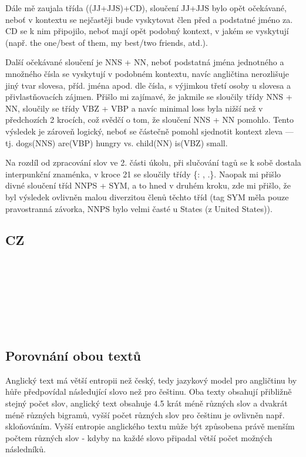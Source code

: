 \documentclass[12pt, a4paper]{report}
\theoremstyle{remark}
\begin{document}
Dále mě zaujala třída ((JJ+JJS)+CD), sloučení JJ+JJS bylo opět očekávané, neboť v kontextu se nejčastěji bude vyskytovat člen před a podstatné jméno za. CD se k nim připojilo, neboť mají opět podobný kontext, v jakém se vyskytují (např. the one/best of them, my best/two friends, atd.).

Další očekávané sloučení je NNS + NN, neboť podstatná jména jednotného a množného čísla se vyskytují v podobném kontextu, navíc angličtina nerozlišuje jiný tvar slovesa, příd. jména apod. dle čísla, s výjimkou třetí osoby u slovesa a přivlastňovacích zájmen. Přišlo mi zajímavé, že jakmile se sloučily třídy NNS + NN, sloučily se třídy VBZ + VBP a navíc minimal loss byla nižší než v předchozích 2 krocích, což svědčí o tom, že sloučení NNS + NN pomohlo. Tento výsledek je zároveň logický, neboť se částečně pomohl sjednotit kontext zleva --- tj. dogs(NNS) are(VBP) hungry vs. child(NN) is(VBZ) small. 

Na rozdíl od zpracování slov ve 2. části úkolu, při slučování tagů se k sobě dostala interpunkční znaménka, v kroce 21 se sloučily třídy \{{: , .}\}.
Naopak mi přišlo divné sloučení tříd NNPS + SYM, a to hned v druhém kroku, zde mi přišlo, že byl výsledek ovlivněn malou diverzitou členů těchto tříd (tag SYM měla pouze pravostranná závorka, NNPS bylo velmi časté u States (z United States)).

\subsection*{CZ}


\




\

\

\







\subsection*{Porovnání obou textů}
Anglický text má větší entropii než český, tedy jazykový model pro angličtinu by hůře předpovídal následující slovo než pro češtinu. Oba texty obsahují přibližně stejný počet slov, anglický text obsahuje 4.5 krát méně různých slov a dvakrát méně různých bigramů, vyšší počet různých slov pro češtinu je ovlivněn např. skloňováním. Vyšší entropie anglického textu může být způsobena právě menším počtem různých slov - kdyby na každé slovo připadal větší počet možných následníků. 
\end{document}
